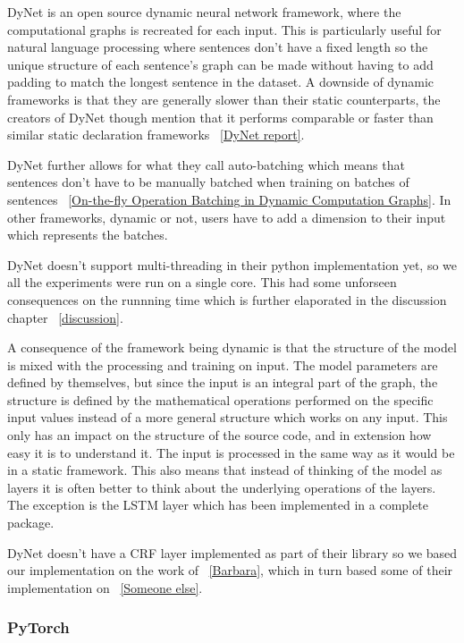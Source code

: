DyNet is an open source dynamic neural network framework, where the
computational graphs is recreated for each input. This is particularly useful
for natural language processing where sentences don't have a fixed length so the
unique structure of each sentence's graph can be made without having to add
padding to match the longest sentence in the dataset. A downside of dynamic
frameworks is that they are generally slower than their static counterparts,
the creators of DyNet though mention that it performs comparable or faster than
similar static declaration frameworks ~\ref{DyNet report}.   

DyNet further allows for what they call auto-batching which means that sentences
don't have to be manually batched when training on batches of sentences
~\ref{On-the-fly Operation Batching in Dynamic Computation Graphs}. In other
frameworks, dynamic or not, users have to add a dimension to their input which
represents the batches.

DyNet doesn't support multi-threading in their python implementation yet, so we
all the experiments were run on a single core. This had some unforseen
consequences on the runnning time which is further elaporated in the discussion
chapter ~\ref{discussion}.

A consequence of the framework being dynamic is that the structure of the model
is mixed with the processing and training on input. The model parameters are
defined by themselves, but since the input is an integral part of the graph, the
structure is defined by the mathematical operations performed on the specific
input values instead of a more general structure which works on any input. This
only has an impact on the structure of the source code, and in extension how
easy it is to understand it. The input is processed in the same way as it would
be in a static framework. This also means that instead of thinking of the model
as layers it is often better to think about the underlying operations of the
layers. The exception is the LSTM layer which has been implemented in a complete
package.

DyNet doesn't have a CRF layer implemented as part of their library so we based
our implementation on the work of ~\ref{Barbara}, which in turn based some of
their implementation on ~\ref{Someone else}. 


\subsubsection*{PyTorch}

